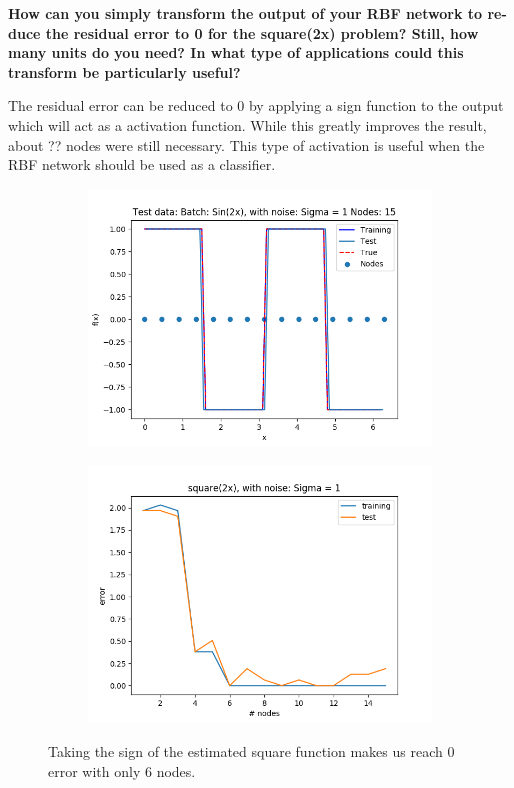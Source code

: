 \documentclass{article}
\begin{document}
\textbf{How can you simply transform the output of your RBF network to re- duce the residual error to 0 for the square(2x) problem? Still, how many units do you need? In what type of applications could this transform be particularly useful?}

The residual error can be reduced to 0 by applying a sign function to the output which will act as a activation function. While this greatly improves the result, about ?? nodes were still necessary. This type of activation is useful when the RBF network should be used as a classifier. 

\begin{figure}[ht!]
    \centering
    \begin{subfigure}[t]{0.4\textwidth}
        \centering
        \includegraphics[width=1\textwidth]{plots/batch/best_square_cheat.png}
        \caption{}
    \end{subfigure}
    \begin{subfigure}[t]{0.4\textwidth}
        \centering
        \includegraphics[width=1\textwidth]{plots/batch/square_error_sign}
        \caption{}
    \end{subfigure}
    \caption{Taking the sign of the estimated square function makes us reach 0 error with only 6 nodes.}
\end{figure}
\end{document}
